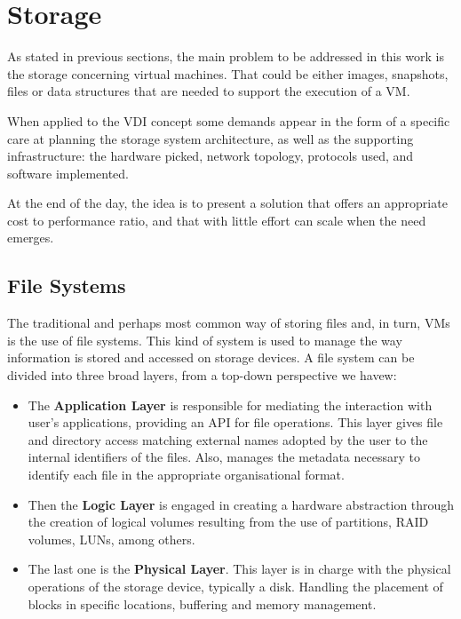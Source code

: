 \section{Storage} %
\label{sec:storage}

As stated in previous sections, the main problem to be addressed in this work is the storage concerning virtual machines. That could be either images, snapshots, files or data structures that are needed to support the execution of a VM. 

When applied to the VDI concept some demands appear in the form of a specific care at planning the storage system architecture, as well as the supporting infrastructure: the hardware picked, network topology, protocols used, and software implemented.

At the end of the day, the idea is to present a solution that offers an appropriate cost to performance ratio, and that with little effort can scale when the need emerges.


\subsection{File Systems} %
\label{sub:file_systems}

The traditional and perhaps most common way of storing files and, in turn, VMs is the use of file systems.
This kind of system is used to manage the way information is stored and accessed on storage devices. A file system can be divided into three broad layers, from a top-down perspective we havew:

\begin{itemize}
	\item The \textbf{Application Layer} is responsible for mediating the interaction with user's applications, providing an API for file operations. This layer gives file and directory access matching external names adopted by the user to the internal identifiers of the files. Also, manages the metadata necessary to identify each file in the appropriate organisational format.
	\item Then the \textbf{Logic Layer} is engaged in creating a hardware abstraction through the creation of logical volumes resulting from the use of partitions, RAID volumes, LUNs, among others.
	\item The last one is the \textbf{Physical Layer}. This layer is in charge with the physical operations of the storage device, typically a disk. Handling the placement of blocks in specific locations, buffering and memory management.
\end{itemize}


